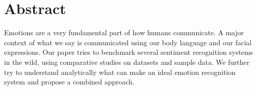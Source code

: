 \section{Abstract}
Emotions are a very fundamental part of how humans communicate. A major context of what we say is communicated using our body language and our facial expressions. Our paper tries to benchmark several sentiment recognition systems in the wild, using comparative studies on datasets and sample data. We further try to understand analytically what can make an ideal emotion recognition system and propose a combined approach. 